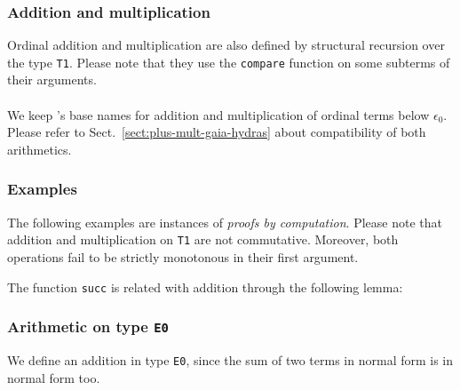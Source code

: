  
  
\subsubsection{Addition and multiplication}

Ordinal addition and multiplication are also defined by structural recursion over the type \texttt{T1}. Please note that they use the \texttt{compare} function on some subterms of their arguments.

\label{sect:infix-plus-T1}





\paragraph*{\gaiasign}
We keep \gaia's base names for
addition and multiplication of ordinal terms below $\epsilon_0$.
Please refer to Sect.~\ref{sect:plus-mult-gaia-hydras} about compatibility of both arithmetics.

\subsubsection{Examples}

The following examples are instances of \emph{proofs by computation}. Please note that  addition and multiplication on \texttt{T1}
are not commutative. Moreover,  both operations fail to be strictly monotonous in their first argument.






The function \texttt{succ} is related with addition through the following lemma:




\subsubsection{Arithmetic on type \texttt{E0}}

 We define an addition in type \texttt{E0}, since the sum of two terms in normal form is in normal form too.







